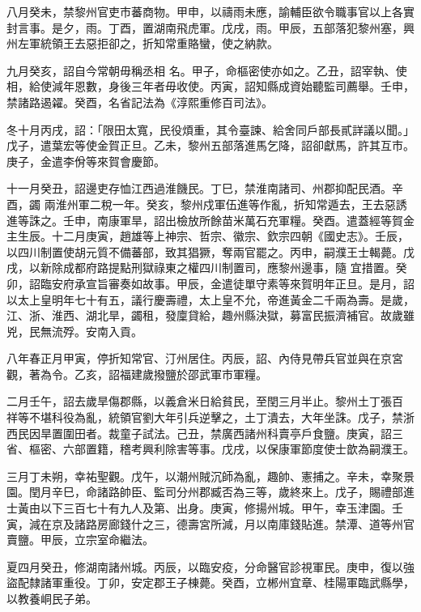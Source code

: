\begin{pinyinscope}
 八月癸未，禁黎州官吏市蕃商物。甲申，以禱雨未應，諭輔臣欲令職事官以上各實封言事。是夕，雨。丁酉，置湖南飛虎軍。戊戌，雨。甲辰，五部落犯黎州塞，興州左軍統領王去惡拒卻之，折知常重賂蠻，使之納款。



 九月癸亥，詔自今常朝毋稱丞相
 名。甲子，命樞密使亦如之。乙丑，詔宰執、使相，給使減年恩數，身後三年者毋收使。丙寅，詔知縣成資始聽監司薦舉。壬申，禁諸路遏糴。癸酉，名省記法為《淳熙重修百司法》。



 冬十月丙戌，詔：「限田太寬，民役煩重，其令臺諫、給舍同戶部長貳詳議以聞。」戊子，遣葉宏等使金賀正旦。乙未，黎州五部落進馬乞降，詔卻獻馬，許其互市。庚子，金遣李佾等來賀會慶節。



 十一月癸丑，詔邊吏存恤江西過淮饑民。丁巳，禁淮南諸司、州郡抑配民酒。辛酉，蠲
 兩淮州軍二稅一年。癸亥，黎州戍軍伍進等作亂，折知常遁去，王去惡誘進等誅之。壬申，南康軍旱，詔出檢放所餘苗米萬石充軍糧。癸酉。遣蓋經等賀金主生辰。十二月庚寅，趙雄等上神宗、哲宗、徽宗、欽宗四朝《國史志》。壬辰，以四川制置使胡元質不備蕃部，致其猖獗，奪兩官罷之。丙申，嗣濮王士輵薨。戊戌，以新除成都府路提點刑獄祿東之權四川制置司，應黎州邊事，隨
 宜措置。癸卯，詔臨安府承宣旨審奏如故事。甲辰，金遣徒單守素等來賀明年正旦。是月，詔以太上皇明年七十有五，議行慶壽禮，太上皇不允，帝進黃金二千兩為壽。是歲，江、浙、淮西、湖北旱，蠲租，發廩貸給，趣州縣決獄，募富民振濟補官。故歲雖兇，民無流殍。安南入貢。



 八年春正月甲寅，停折知常官、汀州居住。丙辰，詔、內侍見帶兵官並與在京宮觀，著為令。乙亥，詔福建歲撥鹽於邵武軍市軍糧。



 二月壬午，詔去歲旱傷郡縣，以義倉米日給貧民，至閏三月半止。黎州土丁張百
 祥等不堪科役為亂，統領官劉大年引兵逆擊之，土丁潰去，大年坐誅。戊子，禁浙西民因旱置圍田者。裁童子試法。己丑，禁廣西諸州科賣亭戶食鹽。庚寅，詔三省、樞密、六部置籍，稽考興利除害等事。戊戌，以保康軍節度使士歆為嗣濮王。



 三月丁未朔，幸祐聖觀。戊午，以潮州賊沉師為亂，趣帥、憲捕之。辛未，幸聚景園。閏月辛巳，命諸路帥臣、監司分州郡臧否為三等，歲終來上。戊子，賜禮部進士黃由以下三百七十有九人及第、出身。庚寅，修揚州城。甲午，幸玉津園。壬寅，減在京及諸路房廊錢什之三，德壽宮所減，月以南庫錢貼進。禁潭、道等州官賣鹽。甲辰，立宗室命繼法。



 夏四月癸丑，修湖南諸州城。丙辰，以臨安疫，分命醫官診視軍民。庚申，復以強盜配隸諸軍重役。丁卯，安定郡王子棟薨。癸酉，立郴州宜章、桂陽軍臨武縣學，以教養峒民子弟。




\end{pinyinscope}
